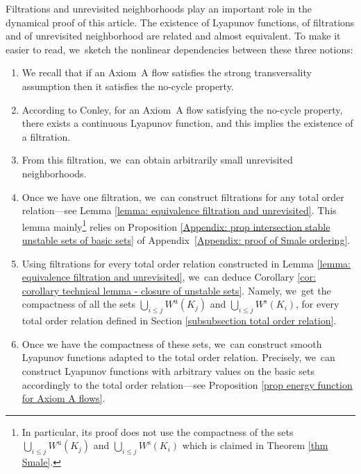 \documentclass[JEP,XML,SOM,Unicode,NoEqCountersInSection,NoFloatCountersInSection,published]{cedram}
\newcommand{\rs}{\mathrm{s}}
\newcommand{\ru}{\mathrm{u}}
\theoremstyle{definition}
\theoremstyle{plain}
\begin{document}
Filtrations and unrevisited neighborhoods play an important role in the dynamical proof of this article. The existence of Lyapunov functions, of filtrations and of unrevisited neighborhood are related and almost equivalent. To make it easier to read, we~sketch the nonlinear dependencies between these three notions:
\begin{enumerate}
\item We recall that if an Axiom~A flow satisfies the strong transversality assumption then it satisfies the no-cycle property.
\item According to Conley, for an Axiom~A flow satisfying the no-cycle property, there exists a continuous Lyapunov function, and this implies the existence of a filtration.
\item From this filtration, we~can obtain arbitrarily small unrevisited neighborhoods.
\item Once we have one filtration, we~can construct filtrations for any total order relation---see Lemma \ref{lemma: equivalence filtration and unrevisited}. This lemma mainly\footnote{In particular, its proof does not use the compactness of the sets $ \bigcup_{i \leq j} W^\ru (K_j)$ and $ \bigcup_{i \leq j} W^\rs (K_i)$ which is claimed in Theorem \ref{thm Smale}.} relies on Proposition \ref{Appendix: prop intersection stable unstable sets of basic sets} of Appendix~\ref{Appendix: proof of Smale ordering}.
\item Using filtrations for every total order relation constructed in Lemma \ref{lemma: equivalence filtration and unrevisited}, we~can deduce Corollary \ref{cor: corollary technical lemma - closure of unstable sets}. Namely, we~get the compactness of all the sets $ \bigcup_{i \leq j} W^\ru (K_j)$ and $ \bigcup_{i \leq j} W^\rs (K_i)$, for every total order relation defined in Section \ref{subsubsection total order relation}.
\item Once we have the compactness of these sets, we~can construct smooth Lyapunov functions adapted to the total order relation. Precisely, we~can construct Lyapunov functions with arbitrary values on the basic sets accordingly to the total order relation---see Proposition \ref{prop energy function for Axiom A flows}.
\end{enumerate}
\end{document}
